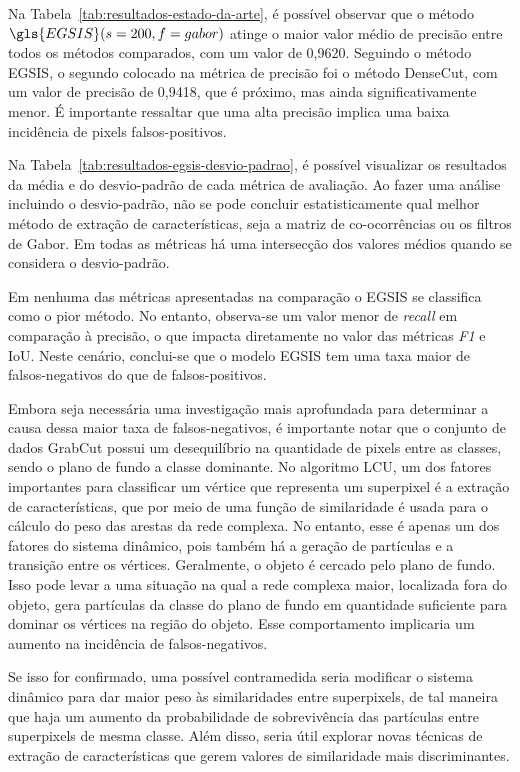 Na Tabela~\ref{tab:resultados-estado-da-arte}, é possível
observar que o método $\gls{EGSIS}(s=200, f=gabor)$ atinge o maior
valor médio de precisão entre todos os métodos comparados, com um
valor de 0,9620. Seguindo o método EGSIS, o segundo colocado na
métrica de precisão foi o método DenseCut, com um valor de precisão de
0,9418, que é próximo, mas ainda significativamente menor. É
importante ressaltar que uma alta precisão implica uma baixa
incidência de pixels falsos-positivos.

Na Tabela~\ref{tab:resultados-egsis-desvio-padrao}, é possível
visualizar os resultados da média e do desvio-padrão de cada métrica
de avaliação. Ao fazer uma análise incluindo o desvio-padrão, não se
pode concluir estatisticamente qual melhor método de extração de
características, seja a matriz de co-ocorrências ou os filtros de
Gabor. Em todas as métricas há uma intersecção dos valores médios
quando se considera o desvio-padrão.

Em nenhuma das métricas apresentadas na comparação o EGSIS se
classifica como o pior método. No entanto, observa-se um valor menor
de \textit{recall} em comparação à precisão, o que impacta diretamente
no valor das métricas \textit{F1} e IoU. Neste cenário, conclui-se que
o modelo EGSIS tem uma taxa maior de falsos-negativos do que de
falsos-positivos.

Embora seja necessária uma investigação mais aprofundada para
determinar a causa dessa maior taxa de falsos-negativos, é importante
notar que o conjunto de dados GrabCut possui um desequilíbrio na
quantidade de pixels entre as classes, sendo o plano de fundo a classe
dominante. No algoritmo \gls{LCU}, um dos fatores importantes para
classificar um vértice que representa um superpixel é a extração de
características, que por meio de uma função de similaridade é usada
para o cálculo do peso das arestas da rede complexa. No entanto, esse
é apenas um dos fatores do sistema dinâmico, pois também há a geração
de partículas e a transição entre os vértices. Geralmente, o objeto é
cercado pelo plano de fundo. Isso pode levar a uma situação na qual a
rede complexa maior, localizada fora do objeto, gera partículas da
classe do plano de fundo em quantidade suficiente para dominar os
vértices na região do objeto. Esse comportamento implicaria um aumento
na incidência de falsos-negativos.

Se isso for confirmado, uma possível contramedida seria modificar o
sistema dinâmico para dar maior peso às similaridades entre
superpixels, de tal maneira que haja um aumento da probabilidade
de sobrevivência das partículas entre superpixels de mesma
classe. Além disso, seria útil explorar novas técnicas de extração de
características que gerem valores de similaridade mais
discriminantes.

